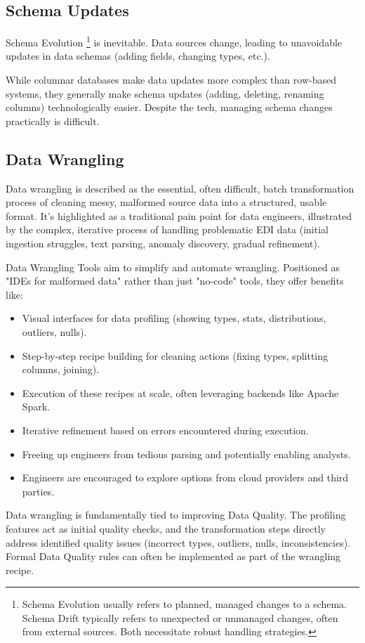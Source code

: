 \subsection*{Schema Updates}
Schema Evolution
\footnote{
    Schema Evolution usually refers to planned,
    managed changes to a schema. Schema Drift
    typically refers to unexpected or unmanaged
    changes, often from external sources. Both 
    necessitate robust handling strategies.
}
is inevitable. Data sources change,
leading to unavoidable updates in data schemas
(adding fields, changing types, etc.).

While columnar databases make data updates
more complex than row-based systems, they
generally make schema updates (adding,
deleting, renaming columns) technologically
easier. Despite the tech, managing schema
changes practically is difficult. 




\subsection*{Data Wrangling}
Data wrangling is described as the essential,
often difficult, batch transformation process of
cleaning messy, malformed source data into a structured,
usable format. It's highlighted as a traditional pain
point for data engineers, illustrated by the complex,
iterative process of handling problematic EDI data
(initial ingestion struggles, text parsing, anomaly
discovery, gradual refinement).

Data Wrangling Tools aim to simplify and automate
wrangling. Positioned as "IDEs for malformed data"
rather than just "no-code" tools, they offer benefits
like: 
\begin{itemize}
    \item Visual interfaces for data profiling
    (showing types, stats, distributions, outliers,
    nulls).

    \item Step-by-step recipe building for cleaning
    actions (fixing types, splitting columns, joining).

    \item Execution of these recipes at scale, often
    leveraging backends like Apache Spark.

    \item Iterative refinement based on errors
    encountered during execution.

    \item Freeing up engineers from tedious parsing
    and potentially enabling analysts.

    \item Engineers are encouraged to explore options
    from cloud providers and third parties.
\end{itemize}
Data wrangling is fundamentally tied to improving Data Quality.
The profiling features act as initial quality checks, and the
transformation steps directly address identified quality issues
(incorrect types, outliers, nulls, inconsistencies).
Formal Data Quality rules can often be implemented as part of
the wrangling recipe.


